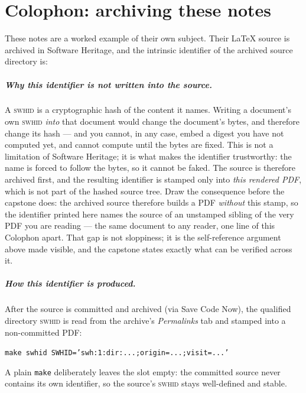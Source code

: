 \clearpage
\chapter*{Colophon: archiving these notes}
\label{ch:colophon}

These notes are a worked example of their own subject. Their \LaTeX{} source is archived in
Software Heritage, and the intrinsic identifier of the archived source directory is:

\begin{center}
\end{center}

\paragraph{Why this identifier is not written into the source.}
A \textsc{swhid} is a cryptographic hash of the content it names. Writing a document's own
\textsc{swhid} \emph{into} that document would change the document's bytes, and therefore
change its hash --- and you cannot, in any case, embed a digest you have not computed yet, and
cannot compute until the bytes are fixed. This is not a limitation of Software Heritage; it is what
makes the identifier
trustworthy: the name is forced to follow the bytes, so it cannot be faked. The source is
therefore archived first, and the resulting identifier is stamped only into \emph{this
rendered PDF}, which is not part of the hashed source tree.
Draw the consequence before the capstone does: the archived source therefore builds a PDF
\emph{without} this stamp, so the identifier printed here names the source of an unstamped
sibling of the very PDF you are reading --- the same document to any reader, one line of this
Colophon apart. That gap is not sloppiness; it is the self-reference argument above made
visible, and the capstone states exactly what can be verified across it.

\paragraph{How this identifier is produced.}
After the source is committed and archived (via Save Code Now), the qualified directory
\textsc{swhid} is read from the archive's \emph{Permalinks} tab and stamped into a
non-committed PDF:
\begin{center}
\texttt{make swhid SWHID='swh:1:dir:...;origin=...;visit=...'}
\end{center}
A plain \texttt{make} deliberately leaves the slot empty: the committed source never contains
its own identifier, so the source's \textsc{swhid} stays well-defined and stable.

